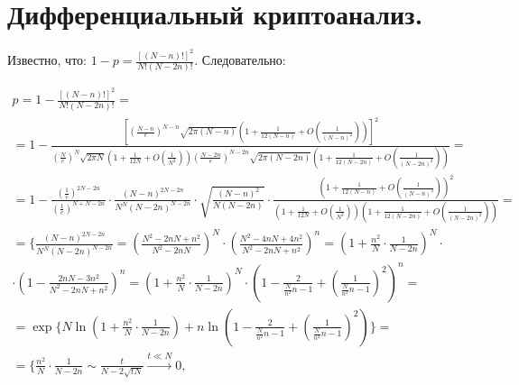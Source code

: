 \section{Дифференциальный криптоанализ.}


Известно, что: $1 - p = \frac{\left[ (N-n)! \right] ^ 2}{N! (N-2n)!}$. Следовательно:

\begin{multline*}
p = 1 -  \frac{\left[ (N-n)! \right] ^ 2}{N! (N-2n)!} = \\ = 1 -  \frac{\left[ \left( \frac{N-n}{e} \right) ^ {N-n} \sqrt{2\pi(N-n)} (1 + \frac{1}{12(N-n)} + O \left(\frac{1}{(N-n)^2} \right)) \right] ^ 2}{\left( \frac{N}{e} \right) ^ {N} \sqrt{2\pi N} (1 + \frac{1}{12N} + O \left(\frac{1}{N^2} \right)) \left( \frac{N-2n}{e} \right) ^ {N-2n} \sqrt{2\pi(N-2n)} (1 + \frac{1}{12(N-2n)} + O \left(\frac{1}{(N-2n)^2} \right))} = \\
= 1 - \frac{\left( \frac{1}{e} \right) ^ {2N - 2n}}{\left( \frac{1}{e} \right) ^ {N + N - 2n}} \cdot \frac{\left( N - n \right) ^ {2N - 2n}}{ N ^ N \left( N - 2n \right) ^ {N - 2n}} \cdot \sqrt{\frac{(N-n)^2}{N(N-2n)}} \cdot \frac{(1 + \frac{1}{12(N-n)} + O \left(\frac{1}{(N-n)^2} \right)) ^ 2}{(1 + \frac{1}{12N} + O \left(\frac{1}{N^2} \right)) (1 + \frac{1}{12(N-2n)} + O \left(\frac{1}{(N-2n)^2} \right))} = \\
= \bigg \{ \frac{\left( N - n \right) ^ {2N - 2n}}{ N ^ N \left( N - 2n \right) ^ {N - 2n}} = \left( \frac{N^2 -2nN + n^2}{N^2 -2nN} \right) ^ N \cdot \left( \frac{N^2 -4nN + 4n^2}{N^2 -2nN + n^2} \right) ^ n = \left( 1 + \frac{n^2}{N} \cdot \frac{1}{N-2n} \right) ^ N \cdot \\
\cdot \left( 1 - \frac{2nN - 3n^2}{N^2 -2nN +n^2} \right) ^ n = \left( 1 + \frac{n^2}{N} \cdot \frac{1}{N-2n} \right) ^ N \cdot \left( 1 - \frac{2}{\frac{N}{n^2} n - 1} + \left( \frac{1}{\frac{N}{n^2} n - 1} \right) ^ 2 \right) ^ n = \\
= \exp \{N \ln \left( 1 + \frac{n^2}{N} \cdot \frac{1}{N-2n} \right) + n \ln \left( 1 - \frac{2}{\frac{N}{n^2} n - 1} + \left( \frac{1}{\frac{N}{n^2} n - 1} \right) ^ 2 \right)\} = \\
= \big \{ \frac{n^2}{N} \cdot \frac{1}{N-2n} \sim \frac{t}{N - 2 \sqrt{tN}} \xrightarrow{t \ll N} 0, \;\;

\end{multline*}
